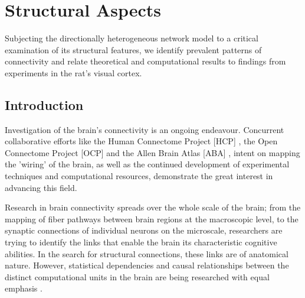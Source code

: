 \chapter{Structural Aspects}\label{ch:structural_aspects} %
Subjecting the directionally heterogeneous network model to a critical
examination of its structural features, we identify prevalent
patterns of connectivity and relate theoretical and computational
results to findings from experiments in the rat's visual cortex.

\section{Introduction}




             

Investigation 
  of the brain's connectivity is an ongoing endeavour.  Concurrent
  collaborative efforts like the Human Connectome Project
  [\textcolor{linkgrey}{HCP}]%
  , the Open Connectome Project [\textcolor{linkgrey}{OCP}]%
  and the Allen Brain Atlas [\textcolor{linkgrey}{ABA}]%
  , intent on mapping the 'wiring' of the brain, as well as the
  continued development of experimental techniques and computational
  resources, demonstrate the
  great interest in advancing this field.

Research in brain connectivity spreads over the whole scale  of the
brain; from the mapping of fiber pathways between brain regions at the
macroscopic level, to the synaptic connections of individual neurons
on the microscale, researchers are trying to identify the links that
enable the brain its characteristic cognitive abilities.
In the search for structural connections, these links are of
anatomical nature. However, statistical dependencies and causal
relationships between the distinct computational units in the brain
are being researched with equal emphasis \parencite{Scholarpedia-BrainConnectivity}.

